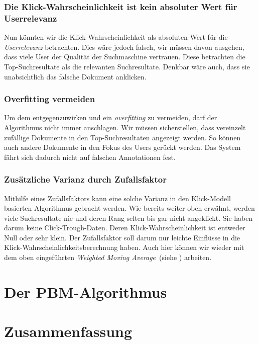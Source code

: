\subsubsection{Die Klick-Wahrscheinlichkeit ist kein absoluter Wert für Userrelevanz}
\label{sec:Reranking:Methodik:Vergessen:Relevanzfeedback}

Nun könnten wir die Klick-Wahrscheinlichkeit als absoluten Wert für die \textit{Userrelevanz} betrachten. Dies wäre jedoch falsch, wir müssen davon ausgehen, dass viele User der Qualität der Suchmaschine vertrauen. Diese betrachten die Top-Suchresultate als die relevanten Suchresultate. Denkbar wäre auch, dass sie unabsichtlich das falsche Dokument anklicken.

\subsubsection{Overfitting vermeiden}
\label{sec:Reranking:Methodik:Vergessen:Overfitting}

Um dem entgegenzuwirken und ein \textit{overfitting} zu vermeiden, darf der Algorithmus nicht immer anschlagen. Wir müssen sicherstellen, dass vereinzelt zufällige Dokumente in den \glqq Top-Suchresultaten\grqq{} angezeigt werden. So können auch andere Dokumente in den Fokus des Users gerückt werden. Das System fährt sich dadurch nicht auf falschen Annotationen fest. 

\subsubsection{Zusätzliche Varianz durch Zufallsfaktor}
\label{sec:Reranking:Methodik:Vergessen:Zufallsfaktor}

Mithilfe eines Zufallsfaktors kann eine solche Varianz in den Klick-Modell basierten Algorithmus gebracht werden. Wie bereits weiter oben erwähnt, werden viele Suchresultate nie und deren Rang selten bis gar nicht angeklickt. Sie haben darum keine Click-Trough-Daten. Deren Klick-Wahrscheinlichkeit ist entweder Null oder sehr klein. Der Zufallsfaktor soll darum nur leichte Einflüsse in die Klick-Wahrscheinlichkeitsberechnung haben. Auch hier können wir wieder mit dem oben eingeführten \textit{Weighted Moving Average}~(siehe \cite{weightedAVG}) arbeiten.


\section{Der PBM-Algorithmus}
\label{sec:Reranking:PBM-Algorithmus}



\section{Zusammenfassung}
\label{sec:Reranking:Zusammenfassung}

